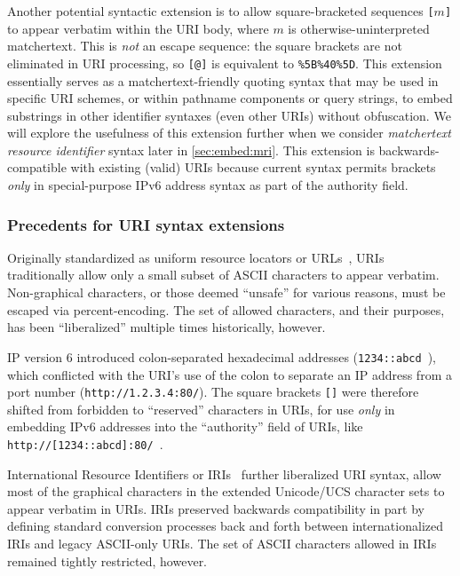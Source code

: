 Another potential syntactic extension is to allow
square-bracketed sequences \verb|[|$m$\verb|]|
to appear verbatim within the URI body,
where $m$ is otherwise-uninterpreted matchertext.
This is \emph{not} an escape sequence:
the square brackets are not eliminated in URI processing,
so \verb|[@]| is equivalent to \verb|%5B%40%5D|.
This extension essentially serves as a matchertext-friendly quoting syntax
that may be used in specific URI schemes,
or within pathname components or query strings,
to embed substrings in other identifier syntaxes (even other URIs)
without obfuscation.
We will explore the usefulness of this extension further
when we consider \emph{matchertext resource identifier} syntax
later in \cref{sec:embed:mri}.
This extension is backwards-compatible with existing (valid) URIs
because current syntax permits brackets \emph{only}
in special-purpose IPv6 address syntax as part of the authority field.




\subsubsection{Precedents for URI syntax extensions}

Originally standardized as uniform resource locators or URLs~\cite{rfc1738},
URIs traditionally allow only a small subset of ASCII characters
to appear verbatim.
Non-graphical characters,
or those deemed ``unsafe'' for various reasons,
must be escaped via percent-encoding.
The set of allowed characters, and their purposes,
has been ``liberalized'' multiple times historically, however.

IP version 6 introduced colon-separated hexadecimal addresses
(\eg \verb|1234::abcd|~\cite{rfc2373}),
which conflicted with the URI's use of the colon to separate
an IP address from a port number (\eg \verb|http://1.2.3.4:80/|).
The square brackets \verb|[]| were therefore shifted
from forbidden to ``reserved'' characters in URIs,
for use \emph{only} in embedding IPv6 addresses
into the ``authority'' field of URIs,
like \verb|http://[1234::abcd]:80/|~\cite{rfc2732}.

International Resource Identifiers or IRIs~\cite{rfc3987}
further liberalized URI syntax,
allow most of the graphical characters
in the extended Unicode/UCS character sets to appear verbatim in URIs.
IRIs preserved backwards compatibility
in part by defining standard conversion processes back and forth
between internationalized IRIs and legacy ASCII-only URIs.
The set of ASCII characters allowed in IRIs remained tightly restricted,
however.

